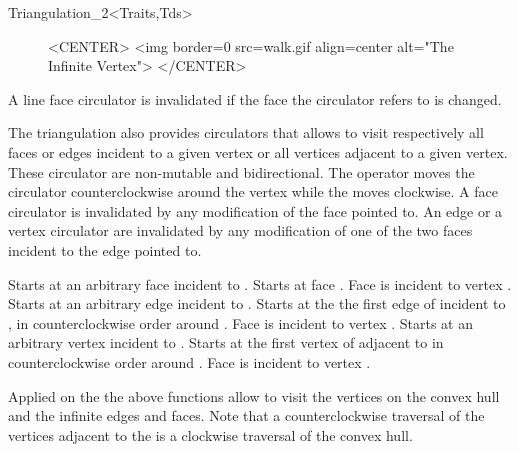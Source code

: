 \begin{ccRefClass}{Triangulation_2<Traits,Tds>}
\begin{figure}
\begin{ccHtmlOnly}
<CENTER>
<img border=0 src=walk.gif align=center alt="The Infinite Vertex">
</CENTER>
\end{ccHtmlOnly} 
\end{figure}

A line face circulator is invalidated if the face the circulator refers
to is changed.

\ccThreeToTwo




The triangulation also provides circulators that allows to visit 
respectively all faces or edges incident to a given vertex
or all vertices adjacent to a given vertex.
These circulator are
non-mutable
and bidirectional.
 The operator  moves the circulator
counterclockwise around the vertex while
the  moves clockwise.
A face circulator is invalidated by any modification of the face pointed to.
An edge or a vertex circulator are invalidated by any modification
of one of the two faces incident to the edge pointed to.

{Starts at an arbitrary face incident
to .}
\ccGlue
{}
{Starts at face .
\ccPrecond Face  is incident to vertex .}
\ccGlue
{}
{Starts at an arbitrary edge incident
to .}
\ccGlue
{}
{Starts at the the first edge of  incident to 
, in counterclockwise order around .
\ccPrecond Face  is incident to vertex .}
\ccGlue
{}
{Starts at an arbitrary  vertex incident
to .}
\ccGlue
{}
{Starts at the first vertex of  adjacent  to 
in  counterclockwise order around .
\ccPrecond Face  is incident to vertex .}





Applied on the 
the above  functions  allow to visit the vertices on the convex hull and
the infinite edges and faces. Note that a counterclockwise
traversal of the vertices adjacent to the  is
a clockwise traversal of the convex hull.


\end{ccRefClass}

